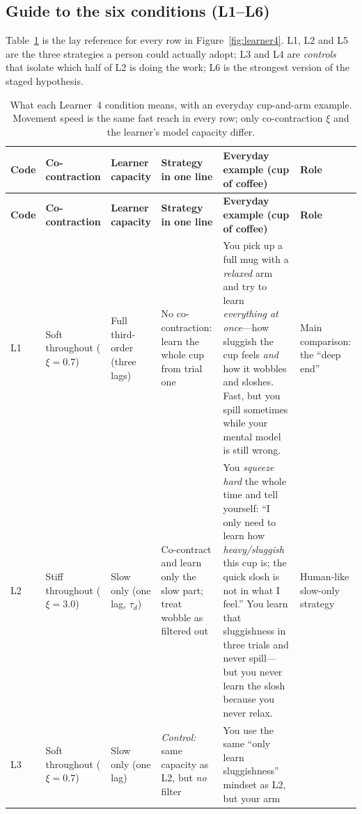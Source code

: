 \documentclass[11pt,a4paper]{article}
\begin{document}
\subsection{Guide to the six conditions (L1--L6)}
\label{sec:learner4guide}

Table~\ref{tab:learner4conditions} is the lay reference for every row in
Figure~\ref{fig:learner4}.  L1, L2 and L5 are the three strategies a person
could actually adopt; L3 and L4 are \emph{controls} that isolate which half
of L2 is doing the work; L6 is the strongest version of the staged
hypothesis.

\small
\begin{longtable}{@{}p{0.7cm}p{1.5cm}p{2.0cm}p{2.2cm}p{4.8cm}p{2.6cm}@{}}
\caption{What each Learner~4 condition means, with an everyday cup-and-arm
example.  Movement speed is the same fast reach in every row; only
co-contraction $\xi$ and the learner's model capacity differ.}
\label{tab:learner4conditions}\\
\toprule
\textbf{Code} & \textbf{Co-contraction} & \textbf{Learner capacity} & \textbf{Strategy in one line} &
\textbf{Everyday example (cup of coffee)} & \textbf{Role} \\
\midrule
\endfirsthead
\toprule
\textbf{Code} & \textbf{Co-contraction} & \textbf{Learner capacity} & \textbf{Strategy in one line} &
\textbf{Everyday example (cup of coffee)} & \textbf{Role} \\
\midrule
\endhead
L1 &
Soft throughout ($\xi=0.7$) &
Full third-order (three lags) &
No co-contraction: learn the whole cup from trial one &
You pick up a full mug with a \emph{relaxed} arm and try to learn
\emph{everything at once}---how sluggish the cup feels \emph{and} how it
wobbles and sloshes.  Fast, but you spill sometimes while your mental model
is still wrong. &
Main comparison: the ``deep end'' \\
\addlinespace
L2 &
Stiff throughout ($\xi=3.0$) &
Slow only (one lag, $\tau_d$) &
Co-contract and learn only the slow part; treat wobble as filtered out &
You \emph{squeeze hard} the whole time and tell yourself: ``I only need to
learn how \emph{heavy/sluggish} this cup is; the quick slosh is not in what
I feel.''  You learn that sluggishness in three trials and never spill---but
you never learn the slosh because you never relax. &
Human-like slow-only strategy \\
\addlinespace
L3 &
Soft throughout ($\xi=0.7$) &
Slow only (one lag) &
\emph{Control:} same capacity as L2, but \emph{no} filter &
You use the same ``only learn sluggishness'' mindset as L2, but your arm

\end{longtable}
\end{document}
